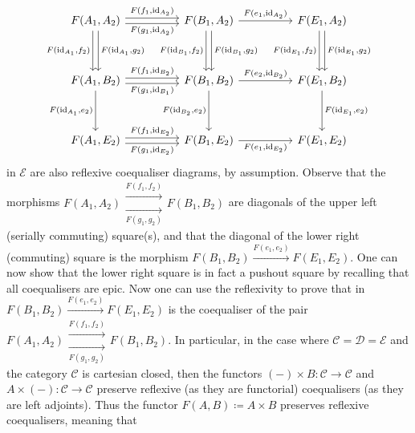 \documentclass[a4paper,11pt]{article}
\theoremstyle{break_italics}
\theoremstyle{break_upright}
\theoremstyle{remark}
\newcommand{\id}{\mathrm{id}}
\newcommand{\C}{\mathcal{C}}
\newcommand{\D}{\mathcal{D}}
\begin{document}
\[
\begin{tikzcd}
{F(A_1,A_2)} \arrow[rr, "{F(f_1, \id_{A_2})}", shift left] \arrow[rr, "{F(g_1,\id_{A_2})}"', shift right] \arrow[dd, "{F(\id_{A_1},g_2)}", shift left] \arrow[dd, "{F(\id_{A_1},f_2)}"', shift right] &  & {F(B_1,A_2)} \arrow[rr, "{F(e_1,\id_{A_2})}"] \arrow[dd, "{F(\id_{B_1}, g_2)}", shift left] \arrow[dd, "{F(\id_{B_1},f_2)}"', shift right] &  & {F(E_1,A_2)} \arrow[dd, "{F(\id_{E_1}, g_2)}", shift left] \arrow[dd, "{F(\id_{E_1}, f_2)}"', shift right] \\ &  &  &  &   \\
{F(A_1,B_2)} \arrow[dd, "{F(\id_{A_1}, e_2)}"'] \arrow[rr, "{F(f_1,\id_{B_2})}", shift left] \arrow[rr, "{F(g_1,\id_{B_1})}"', shift right]                                                           &  & {F(B_1,B_2)} \arrow[rr, "{F(e_2,\id_{B_2})}"] \arrow[dd, "{F(\id_{B_2}, e_2)}"']                                                           &  & {F(E_1,B_2)} \arrow[dd, "{F(\id_{E_1}, e_2)}"]                                                             \\ &  &  &  &  \\
{F(A_1,E_2)} \arrow[rr, "{F(g_1,\id_{E_2})}"', shift right] \arrow[rr, "{F(f_1,\id_{E_2})}", shift left]                                                                                              &  & {F(B_1,E_2)} \arrow[rr, "{F(e_1,\id_{E_2})}"']                                                                                             &  & {F(E_1,E_2)}                                                                                              
\end{tikzcd}
\]
in $\mathcal E$ are also reflexive coequaliser diagrams, by assumption. Observe that the morphisms $F(A_1,A_2) \substack{\xrightarrow{F(f_1,f_2)} \\ \xrightarrow[F(g_1,g_2)]{}} F(B_1,B_2)$ are diagonals of the upper left (serially commuting) square(s), and that the diagonal of the lower right (commuting) square is the morphism $F(B_1,B_2) \xrightarrow{F(e_1,e_2)} F(E_1,E_2)$. One can now show that the lower right square is in fact a pushout square by recalling that all coequalisers are epic. Now one can use the reflexivity to prove that in $F(B_1,B_2) \xrightarrow{F(e_1,e_2)} F(E_1,E_2)$ is the coequaliser of the pair $F(A_1,A_2) \substack{\xrightarrow{F(f_1,f_2)} \\ \xrightarrow[F(g_1,g_2)]{}} F(B_1,B_2)$. In particular, in the case where $\C = \D = \mathcal E$ and the category $\C$ is cartesian closed, then the functors $(-) \times B \colon \C \to \C$ and $A \times (-) \colon \C \to \C$ preserve reflexive (as they are functorial) coequalisers (as they are left adjoints). Thus the functor $F(A, B) \coloneqq A \times B$ preserves reflexive coequalisers, meaning that
\end{document}
